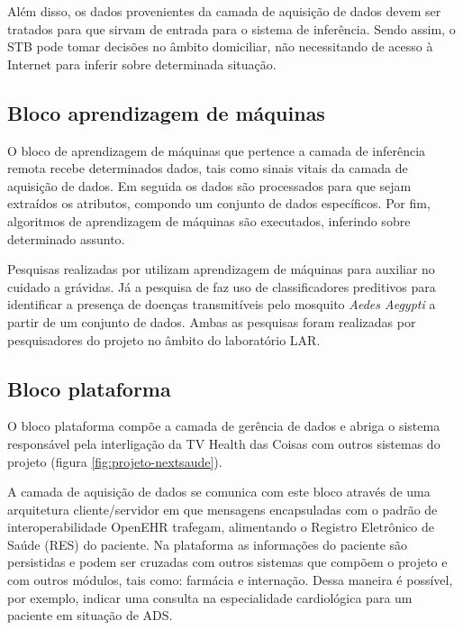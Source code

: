 Além disso, os dados provenientes da camada de aquisição de dados devem ser
tratados para que sirvam de entrada para o sistema de inferência. Sendo assim,
o STB pode tomar decisões no âmbito domiciliar, não necessitando de acesso
à Internet para inferir sobre determinada situação.

\subsection{Bloco aprendizagem de máquinas}

O bloco de aprendizagem de máquinas que pertence a camada de inferência remota
recebe determinados dados, tais como sinais vitais da camada de aquisição de
dados. Em seguida os dados são processados para que sejam extraídos os atributos,
compondo um conjunto de dados específicos. Por fim, algoritmos de aprendizagem
de máquinas são executados, inferindo sobre determinado assunto.

Pesquisas realizadas por  utilizam aprendizagem de
máquinas para auxiliar no cuidado a grávidas. Já a pesquisa de
 faz uso de classificadores preditivos para identificar a
presença de doenças transmitíveis pelo mosquito \textit{Aedes Aegypti} a partir
de um conjunto de dados. Ambas as pesquisas foram realizadas por pesquisadores 
do projeto \nextsaude[] no âmbito do laboratório LAR.

\subsection{Bloco plataforma \nextsaude}

O bloco plataforma \nextsaude[] compõe a camada de gerência de dados e abriga
o sistema responsável pela interligação da TV Health das Coisas com outros sistemas
do projeto \nextsaude[] (figura \ref{fig:projeto-nextsaude}).


A camada de aquisição de dados se comunica com este bloco através de uma
arquitetura cliente/servidor em que mensagens encapsuladas com o padrão
de interoperabilidade OpenEHR trafegam, alimentando o Registro Eletrônico
de Saúde (RES) do paciente. Na plataforma as informações do paciente são
persistidas e podem ser cruzadas com outros sistemas que compõem o projeto
\nextsaude[] e com outros módulos, tais como: farmácia e internação.
Dessa maneira é possível, por exemplo, indicar uma consulta na especialidade
cardiológica para um paciente em situação de ADS.

